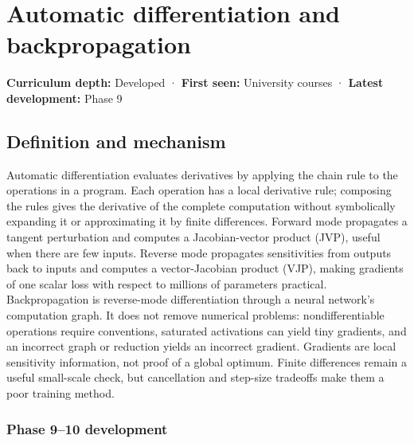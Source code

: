 \hypertarget{appendix-40df0855b4a7}{}\label{referencestart:appendix-40df0855b4a7}
\section{Automatic differentiation and backpropagation}\label{appendix-40df0855b4a7-automatic-differentiation-and-backpropagation}

\hypertarget{appendix-40df0855b4a7-automatic-differentiation-and-backpropagation}{}

\textbf{Curriculum depth:} Developed · \textbf{First seen:} University courses · \textbf{Latest development:} Phase 9

\begin{allmightroledefinition}

\subsection{Definition and mechanism}\label{appendix-40df0855b4a7-definition-and-mechanism}

\hypertarget{appendix-40df0855b4a7-definition-and-mechanism}{}

Automatic differentiation evaluates derivatives by applying the chain rule to the operations in a program. Each operation has a local derivative rule; composing the rules gives the derivative of the complete computation without symbolically expanding it or approximating it by finite differences. Forward mode propagates a tangent perturbation and computes a Jacobian-vector product (JVP), useful when there are few inputs. Reverse mode propagates sensitivities from outputs back to inputs and computes a vector-Jacobian product (VJP), making gradients of one scalar loss with respect to millions of parameters practical. Backpropagation is reverse-mode differentiation through a neural network's computation graph. It does not remove numerical problems: nondifferentiable operations require conventions, saturated activations can yield tiny gradients, and an incorrect graph or reduction yields an incorrect gradient. Gradients are local sensitivity information, not proof of a global optimum. Finite differences remain a useful small-scale check, but cancellation and step-size tradeoffs make them a poor training method.

\end{allmightroledefinition}

\subsubsection{Phase 9--10 development}\label{appendix-40df0855b4a7-phase-910-development}


